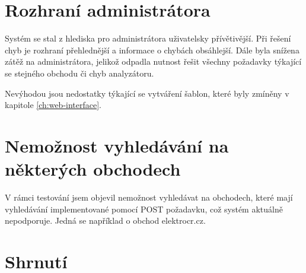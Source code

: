\documentclass[thesis=B,czech]{FITthesis}[2012/06/26]
\begin{document}
\section{Rozhraní administrátora}
Systém se stal z hlediska pro administrátora uživatelsky přívětivější. Při řešení chyb je rozhraní přehlednější a informace o chybách
obsáhlejší. Dále byla snížena zátěž na administrátora, jelikož odpadla nutnost řešit
všechny požadavky týkající se stejného obchodu či chyb analyzátoru.
\par 
Nevýhodou jsou nedostatky týkající se vytváření šablon, které byly zmíněny v kapitole \ref{ch:web-interface}.

\section{Nemožnost vyhledávání na některých obchodech}
V rámci testování jsem objevil nemožnost vyhledávat na obchodech, které mají vyhledávání implementované pomocí POST požadavku, což
systém aktuálně nepodporuje. Jedná se například o obchod elektrocr.cz.


\section{Shrnutí}
\end{document}
